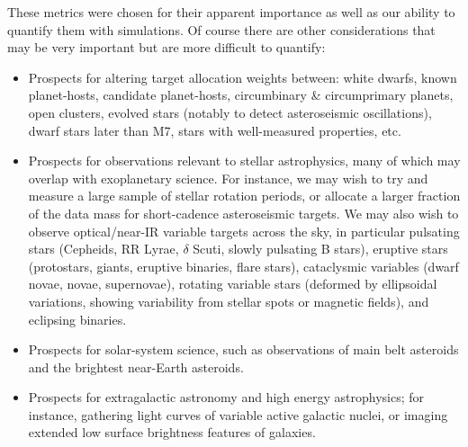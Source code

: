 These metrics were chosen for their apparent importance as well as our
ability to quantify them with simulations. Of course there are other considerations
that may be very important but are more difficult to quantify:
\begin{itemize}
\item Prospects for altering target allocation weights between: white
  dwarfs, known planet-hosts, candidate planet-hosts, circumbinary \&
  circumprimary planets, open clusters, evolved stars (notably to
  detect asteroseismic oscillations), dwarf stars later than M7, stars
  with well-measured properties, etc.
\item Prospects for observations relevant to stellar astrophysics, many of which may overlap with exoplanetary science.
    For instance, we may wish to try and measure a large sample of stellar rotation periods, or allocate a larger fraction of the data mass for short-cadence asteroseismic targets.
    We may also wish to observe optical/near-IR variable targets across the sky, in particular 
	pulsating stars (Cepheids, RR Lyrae, $\delta$ Scuti, slowly pulsating B 
	stars),
	eruptive stars (protostars, giants, eruptive binaries, flare stars), 
	cataclysmic variables (dwarf novae, novae, supernovae), 
	rotating variable stars (deformed by ellipsoidal variations, showing variability from stellar spots or magnetic fields),
	and eclipsing binaries.
\item Prospects for solar-system science, such as observations of main belt asteroids and the brightest near-Earth asteroids.
\item Prospects for extragalactic astronomy and high energy astrophysics; for 
instance, gathering light curves of variable active galactic nuclei, or imaging
extended low surface brightness features of galaxies.
\end{itemize}

